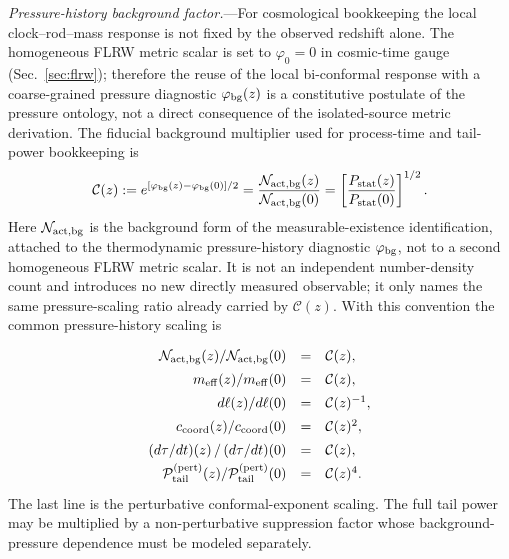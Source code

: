 \documentclass[aps,prd,onecolumn,superscriptaddress,nofootinbib,showpacs,12pt]{revtex4-2}
\begin{document}
\textit{Pressure-history background factor.}---For
cosmological bookkeeping the local clock--rod--mass
response is not fixed by the observed redshift alone.
The homogeneous FLRW metric scalar is set to
$\varphi_0=0$ in cosmic-time gauge (Sec.~\ref{sec:flrw});
therefore the reuse of the local bi-conformal response
with a coarse-grained pressure diagnostic
$\varphi_{\rm bg}(z)$ is a constitutive postulate of
the pressure ontology, not a direct consequence of the
isolated-source metric derivation.  The fiducial
background multiplier used for process-time and
tail-power bookkeeping is
\begin{equation}\label{eq:pressure_history_C}
  \mathcal{C}(z)
  := e^{[\varphi_{\rm bg}(z)-\varphi_{\rm bg}(0)]/2}
  =
  \frac{\mathcal N_{\rm act,bg}(z)}
       {\mathcal N_{\rm act,bg}(0)}
  = \left[
      \frac{P_{\mathrm{stat}}(z)}
           {P_{\mathrm{stat}}(0)}
    \right]^{1/2}.
\end{equation}
Here $\mathcal N_{\rm act,bg}$ is the background form of the
measurable-existence identification, attached to the thermodynamic
pressure-history diagnostic
$\varphi_{\rm bg}$, not to a second homogeneous FLRW metric scalar.  It is
not an independent number-density count and introduces no new directly
measured observable; it only names the same pressure-scaling ratio already
carried by $\mathcal C(z)$.
With this convention the common pressure-history scaling is
\begin{equation}\label{eq:early_scaling}
\renewcommand{\arraystretch}{1.4}
\begin{array}{rcll}
  \mathcal N_{\rm act,bg}(z)/\mathcal N_{\rm act,bg}(0)
    &=& \mathcal{C}(z), \\
  m_{\mathrm{eff}}(z)/m_{\mathrm{eff}}(0)
    &=& \mathcal{C}(z), \\
  d\ell(z)/d\ell(0)
    &=& \mathcal{C}(z)^{-1}, \\
  c_{\mathrm{coord}}(z)/c_{\mathrm{coord}}(0)
    &=& \mathcal{C}(z)^{2}, \\
  (d\tau/dt)(z)\,/\,(d\tau/dt)(0)
    &=& \mathcal{C}(z), \\
  \mathcal{P}_{\mathrm{tail}}^{(\mathrm{pert})}(z)/
  \mathcal{P}_{\mathrm{tail}}^{(\mathrm{pert})}(0)
    &=& \mathcal{C}(z)^{4}.
\end{array}
\end{equation}
The last line is the perturbative conformal-exponent
scaling.  The full tail power may be multiplied by a
non-perturbative suppression factor whose background-pressure
dependence must be modeled separately.
\end{document}
